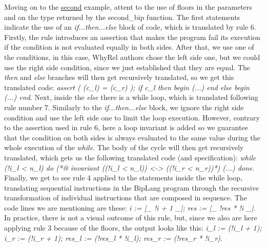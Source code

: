Moving on to the \hyperref[fig:trans-ex-second]{second} example, attent to the use of floors in the parameters and on the type returned by the second\_bip function.
The first statements indicate the use of an \emph{if...then...else} block of code, which is translated by rule 6.
Firstly, the rule introduces an assertion that makes the program fail its execution if the condition is not evaluated equally in both sides.
After that, we use one of the conditions, in this case, WhyRel authors chose the left side one, but we could use the right side condition, since we just established that they are equal.
The \emph{then} and \emph{else} branches will then get recursively translated, so we get this translated code: \emph{assert ( (c\_l) = (c\_r) ); if c\_l then begin (...) end else begin (...) end}. 
Next, inside the \emph{else} there is a while loop, which is translated following rule number 7.
Similarly to the \emph{if...then...else} block, we ignore the right side condition and use the left side one to limit the loop execution.
However, contrary to the assertion used in rule 6, here a loop invariant is added so we guarantee that the condition on both sides is always evaluated to the same value during the whole execution of the \emph{while}.
The body of the cycle will then get recursively translated, which gets us the following translated code (and specification): \emph{while (!i\_l < n\_l) do (*@ invariant ((!i\_l < n\_l)) <-> ((!i\_r < n\_r))*) (...) done}.
Finally, we get to see rule 4 applied to the statements inside the while loop, translating sequential instructions in the BipLang program through the recursive transformation of individual instructions that are composed in sequence.
The code lines we are mentioning are these: \emph{i := |\_ !i + 1 \_|; res := |\_ !res * !i \_|}.
In practice, there is not a visual outcome of this rule, but, since we also are here applying rule 3 because of the floors, the output looks like this: \emph{i\_l := (!i\_l + 1); i\_r := (!i\_r + 1); res\_l := (!res\_l * !i\_l); res\_r := (!res\_r * !i\_r)}.

